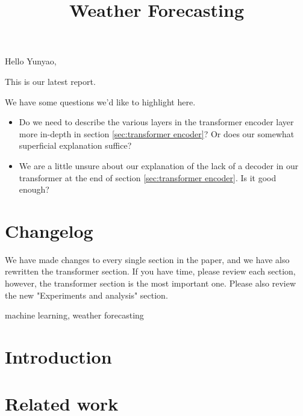 


Hello Yunyao,

This is our latest report.

We have some questions we'd like to highlight here.

\begin{itemize}
    \item Do we need to describe the various layers in the transformer encoder layer more in-depth in section \ref{sec:transformer encoder}? Or does our somewhat superficial explanation suffice? 
    \item We are a little unsure about our explanation of the lack of a decoder in our transformer at the end of section \ref{sec:transformer encoder}. Is it good enough?
\end{itemize}

\section{Changelog}
We have made changes to every single section in the paper, and we have also rewritten the transformer section. 
If you have time, please review each section, however, the transformer section is the most important one.
Please also review the new "Experiments and analysis" section.

\newpage

\title{Weather Forecasting}
\author{
    \and
    \and
    \and
}

\maketitle

\begin{abstract}
\end{abstract}

\begin{IEEEkeywords}
machine learning, weather forecasting
\end{IEEEkeywords}

\section{Introduction}


\section{Related work}\label{sec:relatedwork}





